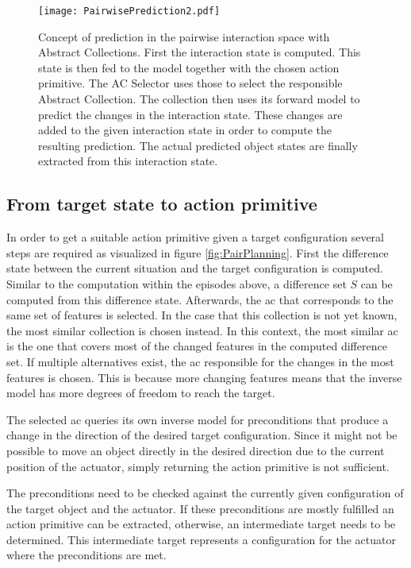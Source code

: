 \begin{figure}
	\centering
	\texttt{[image: PairwisePrediction2.pdf]}
	\caption{Concept of prediction in the pairwise interaction space with Abstract Collections. First the interaction state is computed. This state is then fed to the model together with the chosen action primitive. The AC Selector uses those to select the responsible Abstract Collection. The collection then uses its forward model to predict the changes in the interaction state. These changes are added to the given interaction state in order to compute the resulting prediction. The actual predicted object states are finally extracted from this interaction state.} 
	\label{fig:PairPrediction}
\end{figure}

\subsection{From target state to action primitive \label{sec:pairPlanning}}

In order to get a suitable action primitive given a target configuration several steps are required as visualized in figure \ref{fig:PairPlanning}. 
First the difference state between the current situation and the target configuration is computed. Similar to the computation within the episodes above, a difference set $S$ can be computed from this difference state. Afterwards, the \gls{ac} that corresponds to the same set of features is selected. In the case that this collection is not yet known, the most similar collection is chosen instead. In this context, the most similar \gls{ac} is the one that covers most of the changed features in the computed difference set. If multiple alternatives exist, the \gls{ac} responsible for the changes in the most features is chosen. This is because more changing features means that the inverse model has more degrees of freedom to reach the target.

The selected \gls{ac} queries its own inverse model for preconditions that produce a change in the direction of the desired target configuration. 
Since it might not be possible to move an object directly in the desired direction due to the current position of the actuator, simply returning the action primitive is not sufficient.

The preconditions need to be checked against the currently given configuration of the target object and the actuator. If these preconditions are mostly fulfilled an action primitive can be extracted, otherwise, an intermediate target needs to be determined. This intermediate target represents a configuration for the actuator where the preconditions are met.

